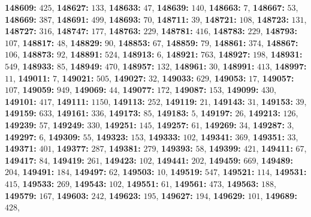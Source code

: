 \textsf{\bfseries 148609:} $425$, \textsf{\bfseries 148627:} $133$, \textsf{\bfseries 148633:} $47$, \textsf{\bfseries 148639:} $140$, \textsf{\bfseries 148663:} $7$, \textsf{\bfseries 148667:} $53$, \textsf{\bfseries 148669:} $387$, \textsf{\bfseries 148691:} $499$, \textsf{\bfseries 148693:} $70$, \textsf{\bfseries 148711:} $39$, \textsf{\bfseries 148721:} $108$, \textsf{\bfseries 148723:} $131$, \textsf{\bfseries 148727:} $316$, \textsf{\bfseries 148747:} $177$, \textsf{\bfseries 148763:} $229$, \textsf{\bfseries 148781:} $416$, \textsf{\bfseries 148783:} $229$, \textsf{\bfseries 148793:} $107$, \textsf{\bfseries 148817:} $48$, \textsf{\bfseries 148829:} $90$, \textsf{\bfseries 148853:} $67$, \textsf{\bfseries 148859:} $79$, \textsf{\bfseries 148861:} $374$, \textsf{\bfseries 148867:} $106$, \textsf{\bfseries 148873:} $92$, \textsf{\bfseries 148891:} $524$, \textsf{\bfseries 148913:} $6$, \textsf{\bfseries 148921:} $763$, \textsf{\bfseries 148927:} $198$, \textsf{\bfseries 148931:} $549$, \textsf{\bfseries 148933:} $85$, \textsf{\bfseries 148949:} $470$, \textsf{\bfseries 148957:} $132$, \textsf{\bfseries 148961:} $30$, \textsf{\bfseries 148991:} $413$, \textsf{\bfseries 148997:} $11$, \textsf{\bfseries 149011:} $7$, \textsf{\bfseries 149021:} $505$, \textsf{\bfseries 149027:} $32$, \textsf{\bfseries 149033:} $629$, \textsf{\bfseries 149053:} $17$, \textsf{\bfseries 149057:} $107$, \textsf{\bfseries 149059:} $949$, \textsf{\bfseries 149069:} $44$, \textsf{\bfseries 149077:} $172$, \textsf{\bfseries 149087:} $153$, \textsf{\bfseries 149099:} $430$, \textsf{\bfseries 149101:} $417$, \textsf{\bfseries 149111:} $1150$, \textsf{\bfseries 149113:} $252$, \textsf{\bfseries 149119:} $21$, \textsf{\bfseries 149143:} $31$, \textsf{\bfseries 149153:} $39$, \textsf{\bfseries 149159:} $633$, \textsf{\bfseries 149161:} $336$, \textsf{\bfseries 149173:} $85$, \textsf{\bfseries 149183:} $5$, \textsf{\bfseries 149197:} $26$, \textsf{\bfseries 149213:} $126$, \textsf{\bfseries 149239:} $57$, \textsf{\bfseries 149249:} $330$, \textsf{\bfseries 149251:} $145$, \textsf{\bfseries 149257:} $61$, \textsf{\bfseries 149269:} $34$, \textsf{\bfseries 149287:} $3$, \textsf{\bfseries 149297:} $6$, \textsf{\bfseries 149309:} $55$, \textsf{\bfseries 149323:} $153$, \textsf{\bfseries 149333:} $102$, \textsf{\bfseries 149341:} $369$, \textsf{\bfseries 149351:} $33$, \textsf{\bfseries 149371:} $401$, \textsf{\bfseries 149377:} $287$, \textsf{\bfseries 149381:} $279$, \textsf{\bfseries 149393:} $58$, \textsf{\bfseries 149399:} $421$, \textsf{\bfseries 149411:} $67$, \textsf{\bfseries 149417:} $84$, \textsf{\bfseries 149419:} $261$, \textsf{\bfseries 149423:} $102$, \textsf{\bfseries 149441:} $202$, \textsf{\bfseries 149459:} $669$, \textsf{\bfseries 149489:} $204$, \textsf{\bfseries 149491:} $184$, \textsf{\bfseries 149497:} $62$, \textsf{\bfseries 149503:} $10$, \textsf{\bfseries 149519:} $547$, \textsf{\bfseries 149521:} $114$, \textsf{\bfseries 149531:} $415$, \textsf{\bfseries 149533:} $269$, \textsf{\bfseries 149543:} $102$, \textsf{\bfseries 149551:} $61$, \textsf{\bfseries 149561:} $473$, \textsf{\bfseries 149563:} $188$, \textsf{\bfseries 149579:} $167$, \textsf{\bfseries 149603:} $242$, \textsf{\bfseries 149623:} $195$, \textsf{\bfseries 149627:} $194$, \textsf{\bfseries 149629:} $101$, \textsf{\bfseries 149689:} $428$, 
